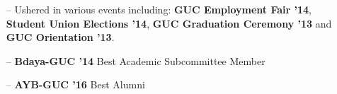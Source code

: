 \documentclass[10pt,a4paper,sans]{moderncv}        %
\begin{document}
\begin{itemize}
\item[--]{Ushered in various events including: \textbf{GUC Employment Fair ’14}, \textbf{Student Union Elections ’14}, \textbf{GUC Graduation Ceremony ’13} and \textbf{GUC Orientation ’13}. }

\vspace{6 pt}

\item[--]{\textbf{Bdaya-GUC '14} Best Academic Subcommittee Member }

\vspace{6 pt}
\item[--]{ \textbf{AYB-GUC '16} Best Alumni }
\end{itemize}




\end{document}
